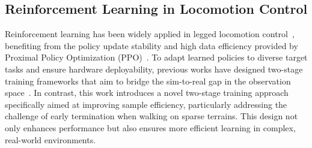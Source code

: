 \subsection{Reinforcement Learning in Locomotion Control}

Reinforcement learning has been widely applied in legged locomotion control~\cite{cheng2024extreme, he2024agile, kumar2021rma, lee2020learning, long2024hybrid, margolis2024rapid, miki2022learning, nahrendra2023dreamwaq, zhuang2023robot}, benefiting from the policy update stability and high data efficiency provided by Proximal Policy Optimization (PPO)~\cite{schulman2017proximal}. To adapt learned policies to diverse target tasks and ensure hardware deployability, previous works have designed two-stage training frameworks that aim to bridge the sim-to-real gap in the observation space~\cite{kumar2021rma, lee2020learning}. In contrast, this work introduces a novel two-stage training approach specifically aimed at improving sample efficiency, particularly addressing the challenge of early termination when walking on sparse terrains. This design not only enhances performance but also ensures more efficient learning in complex, real-world environments.
